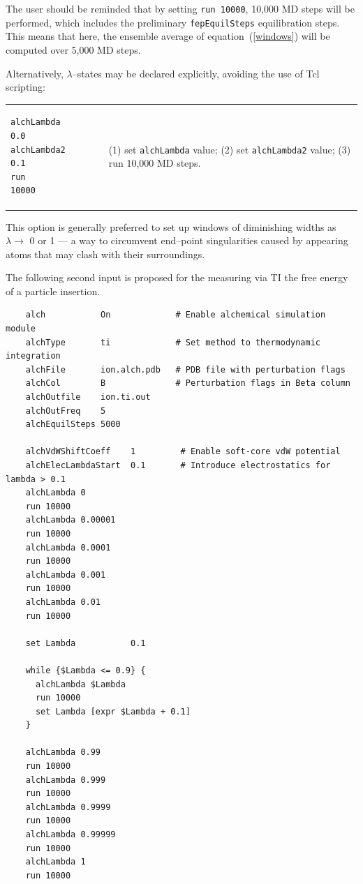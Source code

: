 The user should be reminded that by setting {\tt run  10000},
10,000 MD steps will be performed, which includes the
preliminary {\tt fepEquilSteps} equilibration steps.
This means that here, the ensemble average of equation~({\ref{windows}})
will be computed  over 5,000 MD steps.


Alternatively, $\lambda$--states may be declared
explicitly, avoiding the use of {\sc Tcl} scripting:

\begin{tabular}{ll}
\begin{minipage}{8cm}
\begin{verbatim}
alchLambda      0.0
alchLambda2     0.1
run             10000
\end{verbatim}
\end{minipage}
&
\begin{minipage}{7.8cm}
(1) set {\tt alchLambda} value;
\newline
(2) set {\tt alchLambda2} value;
\newline
(3) run 10,000 MD steps.
\end{minipage}
\end{tabular}


This option is generally preferred to set up windows of diminishing
widths as $\lambda \rightarrow$ 0 or 1 --- a way to circumvent
end--point singularities caused by appearing atoms that may
clash with their surroundings.


The following second input is proposed for the measuring via TI the free energy
of a particle insertion.

\begin{verbatim}
    alch           On             # Enable alchemical simulation module
    alchType       ti             # Set method to thermodynamic integration
    alchFile       ion.alch.pdb   # PDB file with perturbation flags
    alchCol        B              # Perturbation flags in Beta column
    alchOutfile    ion.ti.out
    alchOutFreq    5
    alchEquilSteps 5000

    alchVdWShiftCoeff    1         # Enable soft-core vdW potential
    alchElecLambdaStart  0.1       # Introduce electrostatics for lambda > 0.1
    alchLambda 0
    run 10000
    alchLambda 0.00001
    run 10000
    alchLambda 0.0001
    run 10000
    alchLambda 0.001
    run 10000
    alchLambda 0.01
    run 10000

    set Lambda           0.1

    while {$Lambda <= 0.9} {
      alchLambda $Lambda
      run 10000
      set Lambda [expr $Lambda + 0.1]
    }

    alchLambda 0.99
    run 10000
    alchLambda 0.999
    run 10000
    alchLambda 0.9999
    run 10000
    alchLambda 0.99999
    run 10000
    alchLambda 1
    run 10000

\end{verbatim}

